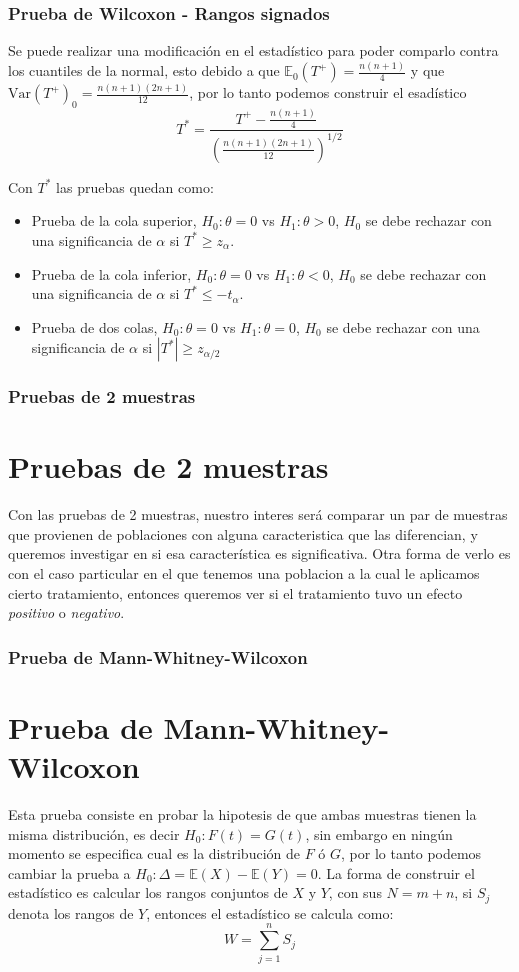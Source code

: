 \documentclass[aspectratio=169,spanish]{beamer}
\begin{document}
\begin{frame}
\frametitle{Prueba de Wilcoxon - Rangos signados}
Se puede realizar una modificación en el estadístico para poder comparlo contra los cuantiles de la normal, esto debido a que $\mathbb{E}_0(T^{+})=\frac{n(n+1)}{4}$ y que $\text{Var}(T^{+})_0=\frac{n(n+1)(2n+1)}{12}$, por lo tanto podemos construir el esadístico 
$$T^{*}=\frac{T^{+}-\frac{n(n+1)}{4}}{\left(\frac{n(n+1)(2n+1)}{12}\right)^{1/2}}$$
\end{frame}

\begin{frame}
Con $T^{*}$ las pruebas quedan como:
\begin{itemize}
\item Prueba de la cola superior, $H_0:\theta=0$ vs $H_1:\theta>0$, $H_0$ se debe rechazar con una significancia de $\alpha$ si $T^{*}\ge z_\alpha$.
\item Prueba de la cola inferior, $H_0:\theta=0$ vs $H_1:\theta<0$, $H_0$ se debe rechazar con una significancia de $\alpha$ si $T^{*}\le -t_\alpha$.
\item Prueba de dos colas, $H_0:\theta=0$ vs $H_1:\theta=0$, $H_0$ se debe rechazar con una significancia de $\alpha$ si $|T^{*}|\ge z_{\alpha/2}$ 
\end{itemize}
\end{frame}


\begin{frame}
\frametitle{Pruebas de 2 muestras}
\section{Pruebas de 2 muestras}
Con las pruebas de 2 muestras, nuestro interes será comparar un par de muestras que provienen de poblaciones con alguna caracteristica que las diferencian, y queremos investigar en si esa característica es significativa. Otra forma de verlo es con el caso particular en el que tenemos una poblacion a la cual le aplicamos cierto tratamiento, entonces queremos ver si el tratamiento tuvo un efecto \emph{positivo} o \emph{negativo}.
\end{frame}


\begin{frame}
\frametitle{Prueba de Mann-Whitney-Wilcoxon}
\section{Prueba de Mann-Whitney-Wilcoxon}
Esta prueba consiste en probar la hipotesis de que ambas muestras tienen la misma distribución, es decir $H_0:F(t)=G(t)$, sin embargo en ningún momento se especifica cual es la distribución de $F$ ó $G$, por lo tanto podemos cambiar la prueba a $H_0:\Delta =\mathbb{E}(X)-\mathbb{E}(Y)=0$.
La forma de construir el estadístico es calcular los rangos conjuntos de $X$ y $Y$, con sus $N=m+n$, si $S_j$ denota los rangos de $Y$, entonces el estadístico se calcula como:
$$W=\sum_{j=1}^{n}S_j$$
\end{frame}
\end{document}

